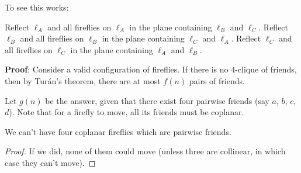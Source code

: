 \documentclass[11pt]{scrartcl}
\begin{document}
To see this works:
\begin{enumerate}
  \ii Reflect $\ell_A$ and all fireflies on $\ell_A$
  in the plane containing $\ell_B$ and $\ell_C$.
  \ii Reflect $\ell_B$ and all fireflies on $\ell_B$
  in the plane containing $\ell_C$ and $\ell_A$.
  \ii Reflect $\ell_C$ and all fireflies on $\ell_C$
  in the plane containing $\ell_A$ and $\ell_B$.
  \ii[$\vdots$]
\end{enumerate}

\bigskip

\textbf{Proof}:
Consider a valid configuration of fireflies.
If there is no $4$-clique of friends,
then by Tur\'an's theorem, there are at most $f(n)$ pairs of friends.

Let $g(n)$ be the answer, given that
there exist four pairwise friends (say $a$, $b$, $c$, $d$).
Note that for a firefly to move,
all its friends must be coplanar.
\begin{claim*}
  [No coplanar $K_4$]
  We can't have four coplanar fireflies
  which are pairwise friends.
\end{claim*}
\begin{proof}
  If we did, none of them could move
  (unless three are collinear, in which case they can't move).
\end{proof}
\end{document}

